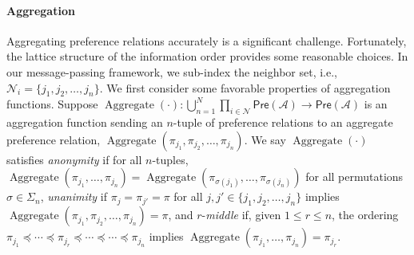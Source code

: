 \documentclass[conference]{ieeeconf}
\renewcommand{\preceq}{\preccurlyeq}
\newcommand{\N}{\mathcal{N}}
\newcommand{\A}{\mathcal{A}}
\newcommand{\Pref}{\mathsf{Pre}}
\renewcommand{\leq}{\leqslant}
\DeclareMathOperator{\Aggregate}{Aggregate}
\DeclareMathOperator{\Permute}{Permute}
\begin{document}
\paragraph{Aggregation}
Aggregating preference relations accurately is a significant challenge. Fortunately, the lattice structure of the information order provides some reasonable choices. In our message-passing framework, we sub-index the neighbor set, i.e., $\N_i = \{j_1,j_2,\dots,j_n\}$. We first consider some favorable properties of aggregation functions. Suppose $\Aggregate(\cdot): \bigcup_{n =1}^{N} \prod_{i \in \N}  \Pref(\A) \to \Pref(\A)$ is an aggregation function sending an $n$-tuple of preference relations to an aggregate preference relation, $\Aggregate(\pi_{j_1},\pi_{j_2}, \dots, \pi_{j_n})$. We say $\Aggregate(\cdot)$ satisfies \emph{anonymity} if for all $n$-tuples, $\Aggregate\left( \pi_{j_1},\dots,\pi_{j_n}\right) = \Aggregate\left(\pi_{\sigma(j_1)},\dots,\pi_{\sigma(j_n)}\right)$ for all permutations $\sigma \in \Sigma_n$,
 \emph{unanimity} if $\pi_{j} = \pi_{j'} = \pi$ for all $j, j' \in \{j_1,j_2,\dots,j_n\}$ implies $\Aggregate\left( \pi_{j_1},\pi_{j_2},\dots,\pi_{j_n}\right) = \pi$,
and $r$-\emph{middle} if, given $1 \leq r \leq n$, the ordering $\pi_{j_1} \preceq \cdots \preceq \pi_{j_r} \preceq \cdots \preceq \cdots \preceq \pi_{j_n}$ implies $\Aggregate\left( \pi_{j_1},\dots,\pi_{j_n}\right) = \pi_{j_r}$.
\end{document}
